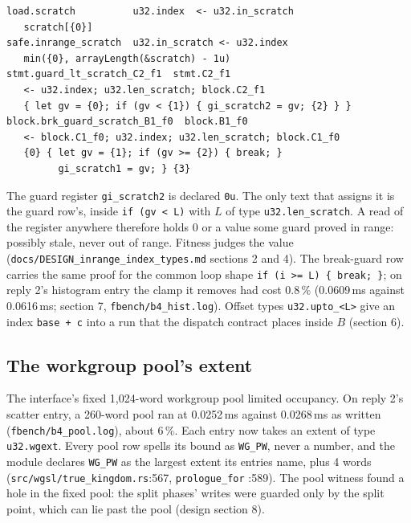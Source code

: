 \documentclass[sigconf,nonacm]{acmart}
\newcommand{\code}[1]{\nolinkurl{#1}}
\newcommand{\src}[1]{{\footnotesize\nolinkurl{#1}}}
\begin{document}
\begin{small}
\begin{verbatim}
load.scratch          u32.index  <- u32.in_scratch
   scratch[{0}]
safe.inrange_scratch  u32.in_scratch <- u32.index
   min({0}, arrayLength(&scratch) - 1u)
stmt.guard_lt_scratch_C2_f1  stmt.C2_f1
   <- u32.index; u32.len_scratch; block.C2_f1
   { let gv = {0}; if (gv < {1}) { gi_scratch2 = gv; {2} } }
block.brk_guard_scratch_B1_f0  block.B1_f0
   <- block.C1_f0; u32.index; u32.len_scratch; block.C1_f0
   {0} { let gv = {1}; if (gv >= {2}) { break; }
         gi_scratch1 = gv; } {3}
\end{verbatim}
\end{small}

The guard register \code{gi_scratch2} is declared \code{0u}. The only text
that assigns it is the guard row's, inside \code{if (gv < L)} with $L$ of type
\code{u32.len_scratch}. A read of the register anywhere therefore holds 0 or a
value some guard proved in range: possibly stale, never out of range. Fitness
judges the value (\src{docs/DESIGN_inrange_index_types.md} sections 2 and 4).
The break-guard row carries the same proof for the common loop shape
\texttt{if (i >= L) \{ break; \}}; on reply 2's histogram entry the clamp it
removes had cost 0.8\,\% (0.0609\,ms against 0.0616\,ms; section 7,
\src{fbench/b4_hist.log}). Offset types \code{u32.upto_<L>} give an index
\code{base + c} into a run that the dispatch contract places inside $B$
(section 6).

\subsection{The workgroup pool's extent}
The interface's fixed 1,024-word workgroup pool limited occupancy. On reply 2's
scatter entry, a 260-word pool ran at 0.0252\,ms against 0.0268\,ms as written
(\src{fbench/b4_pool.log}), about 6\,\%. Each entry now takes an extent of type
\code{u32.wgext}. Every pool row spells its bound as \code{WG_PW}, never a
number, and the module declares \code{WG_PW} as the largest extent its entries
name, plus 4 words (\src{src/wgsl/true_kingdom.rs}:567, \code{prologue_for}
:589). The pool witness found a hole in the fixed pool: the split phases'
writes were guarded only by the split point, which can lie past the pool
(design section 8).
\end{document}
